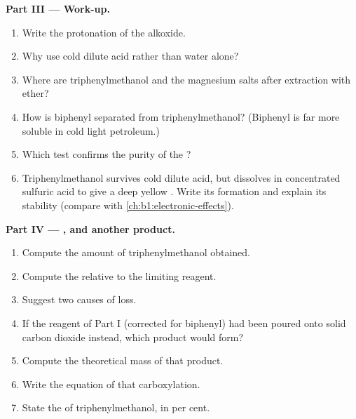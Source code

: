 \begin{problem}
\medskip
\noindent\textbf{Part III --- Work-up.}
\begin{enumerate}[resume]
  \item Write the protonation of the alkoxide.
  \item Why use cold dilute acid rather than water alone?
  \item Where are triphenylmethanol and the magnesium salts after
        extraction with ether?
  \item How is biphenyl separated from triphenylmethanol? (Biphenyl is far
        more soluble in cold light petroleum.)
  \item Which test confirms the purity of the ?
  \item Triphenylmethanol survives cold dilute acid, but dissolves in
        concentrated sulfuric acid to give a deep yellow .
        Write its formation and explain its stability (compare with
        \cref{ch:b1:electronic-effects}).
\end{enumerate}

\medskip
\noindent\textbf{Part IV --- , and another product.}
\begin{enumerate}[resume]
  \item Compute the amount of triphenylmethanol obtained.
  \item Compute the  relative to the limiting reagent.
  \item Suggest two causes of loss.
  \item If the reagent of Part I (corrected for biphenyl) had been poured
        onto solid carbon dioxide instead, which product would form?
  \item Compute the theoretical mass of that product.
  \item Write the equation of that carboxylation.
  \item State the  of triphenylmethanol, in per cent.
\end{enumerate}
\end{problem}
